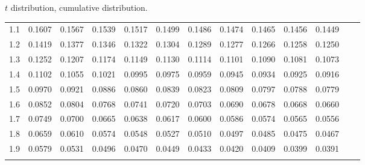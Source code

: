 \begin{frame}{\small $t$ distribution, cumulative distribution.}
{\begin{tabular}{l|llllllllllll}
 1.1 & 0.1607 & 0.1567 & 0.1539 & 0.1517 & 0.1499 & 0.1486 & 0.1474 & 0.1465 & 0.1456 & 0.1449  \\[5pt] \arrayrulecolor{light-gray}\hline\arrayrulecolor{black}  
 1.2 & 0.1419 & 0.1377 & 0.1346 & 0.1322 & 0.1304 & 0.1289 & 0.1277 & 0.1266 & 0.1258 & 0.1250  \\[5pt] \arrayrulecolor{light-gray}\hline\arrayrulecolor{black}  
 1.3 & 0.1252 & 0.1207 & 0.1174 & 0.1149 & 0.1130 & 0.1114 & 0.1101 & 0.1090 & 0.1081 & 0.1073  \\[5pt] \arrayrulecolor{light-gray}\hline\arrayrulecolor{black}  
 1.4 & 0.1102 & 0.1055 & 0.1021 & 0.0995 & 0.0975 & 0.0959 & 0.0945 & 0.0934 & 0.0925 & 0.0916  \\[5pt] \arrayrulecolor{light-gray}\hline\arrayrulecolor{black}  
 1.5 & 0.0970 & 0.0921 & 0.0886 & 0.0860 & 0.0839 & 0.0823 & 0.0809 & 0.0797 & 0.0788 & 0.0779  \\[5pt] \arrayrulecolor{light-gray}\hline\arrayrulecolor{black}  
 1.6 & 0.0852 & 0.0804 & 0.0768 & 0.0741 & 0.0720 & 0.0703 & 0.0690 & 0.0678 & 0.0668 & 0.0660  \\[5pt] \arrayrulecolor{light-gray}\hline\arrayrulecolor{black}  
 1.7 & 0.0749 & 0.0700 & 0.0665 & 0.0638 & 0.0617 & 0.0600 & 0.0586 & 0.0574 & 0.0565 & 0.0556  \\[5pt] \arrayrulecolor{light-gray}\hline\arrayrulecolor{black}  
 1.8 & 0.0659 & 0.0610 & 0.0574 & 0.0548 & 0.0527 & 0.0510 & 0.0497 & 0.0485 & 0.0475 & 0.0467  \\[5pt] \arrayrulecolor{light-gray}\hline\arrayrulecolor{black}  
 1.9 & 0.0579 & 0.0531 & 0.0496 & 0.0470 & 0.0449 & 0.0433 & 0.0420 & 0.0409 & 0.0399 & 0.0391  \\[5pt] \arrayrulecolor{light-gray}\hline\arrayrulecolor{black}  
\end{tabular}

}

\end{frame}


